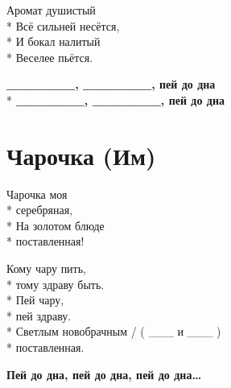 \medskip

\begin{minipage}{\linewidth}
Аромат душистый\\*
Всё сильней несётся,\\*
И бокал налитый\\*
Веселее пьётся.\\
\end{minipage}\par\medskip\nobreak

\medskip

\begin{minipage}{\linewidth}
\hspace*{1.5em}\textbf{\_\_\_\_\_\_\_, \_\_\_\_\_\_\_, пей до дна}\\*
\hspace*{1.5em}\textbf{\_\_\_\_\_\_\_, \_\_\_\_\_\_\_, пей до дна}\\
\end{minipage}

\vspace{\fill}\newpage

\section{Чарочка (Им)}
\label{song:Чарочка_(Им)}

\medskip

\begin{minipage}{\linewidth}
Чарочка моя\\*
серебряная,\\*
На золотом блюде\\*
поставленная!\\
\end{minipage}\par\medskip\nobreak

\medskip

\begin{minipage}{\linewidth}
Кому чару пить,\\*
тому здраву быть.\\*
Пей чару,\\*
пей здраву.\\*
Светлым новобрачным / ( \_\_\_ и \_\_\_ )\\*
поставленная.\\
\end{minipage}\par\medskip\nobreak

\medskip

\begin{minipage}{\linewidth}
\textbf{Пей до дна, пей до дна, пей до дна…}\\
\end{minipage}\par\medskip\nobreak

